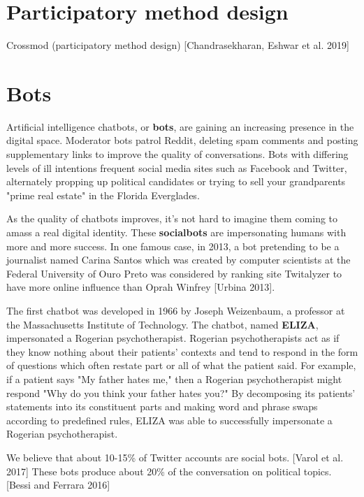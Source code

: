 \documentclass[class=book, crop=false]{standalone}
\providecommand{\keyterm}[1]{\textbf{#1}\marginnote{\scriptsize \textbf{#1}}}
\begin{document}
\section{Participatory method design}

Crossmod (participatory method design) [Chandrasekharan, Eshwar et al. 2019]

\section{Bots}

Artificial intelligence chatbots, or \keyterm{bots}, are gaining an increasing presence in the digital space. Moderator bots patrol Reddit, deleting spam comments and posting supplementary links to improve the quality of conversations. Bots with differing levels of ill intentions frequent social media sites such as Facebook and Twitter, alternately propping up political candidates or trying to sell your grandparents "prime real estate" in the Florida Everglades.

As the quality of chatbots improves, it's not hard to imagine them coming to amass a real digital identity. These \keyterm{socialbots} are impersonating humans with more and more success. In one famous case, in 2013, a bot pretending to be a journalist named Carina Santos which was created by computer scientists at the Federal University of Ouro Preto was considered by ranking site Twitalyzer to have more online influence than Oprah Winfrey [Urbina 2013].

The first chatbot was developed in 1966 by Joseph Weizenbaum, a professor at the Massachusetts Institute of Technology. The chatbot, named \keyterm{ELIZA}, impersonated a Rogerian psychotherapist. Rogerian psychotherapists act as if they know nothing about their patients' contexts and tend to respond in the form of questions which often restate part or all of what the patient said. For example, if a patient says "My father hates me," then a Rogerian psychotherapist might respond "Why do you think your father hates you?" By decomposing its patients' statements into its constituent parts and making word and phrase swaps according to predefined rules, ELIZA was able to successfully impersonate a Rogerian psychotherapist.

We believe that about 10-15\% of Twitter accounts are social bots. [Varol et al. 2017] These bots produce about 20\% of the conversation on political topics. [Bessi and Ferrara 2016]\\
\end{document}
